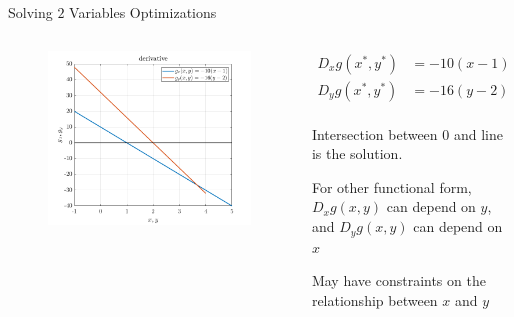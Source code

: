 \documentclass[11pt,aspectratio=169,usenames,dvipsnames]{beamer}
\let\tempone\itemize
\let\temptwo\enditemize
\renewenvironment{itemize}{\tempone\addtolength{\itemsep}{\fill}}{\temptwo}
\begin{document}
\begin{frame}{Solving $2$ Variables Optimizations}
\label{slide:Solving__2__Variables_Optimizations}

    \begin{columns}
        \begin{column}{0.5\textwidth}
            \begin{figure}
                \includegraphics[width=\textwidth]{./figures/2VarOptimize.png}
            \end{figure}
        \end{column}
        \begin{column}{0.5\textwidth}
            \begin{equation*}
                  \begin{split}
                        D_{x} g( x^{*}, y^{*} )
                            & = -10( x-1 ) = 0
                        \\
                        D_{y} g( x^{*}, y^{*} )
                            & = -16( y-2 ) = 0
                        \\
                  \end{split}
            \end{equation*}
            \begin{itemize}
                \item \alert{Intersection} between $ 0 $ and line is the solution.
                \item For other functional form, $ D_{x} g( x, y ) $ can depend on $ y $, and $ D_{y}g( x, y ) $ can depend on $ x $
                \item May have constraints on the relationship between $ x $ and $ y $
            \end{itemize}
        \end{column}
    \end{columns}
\end{frame}
\end{document}
